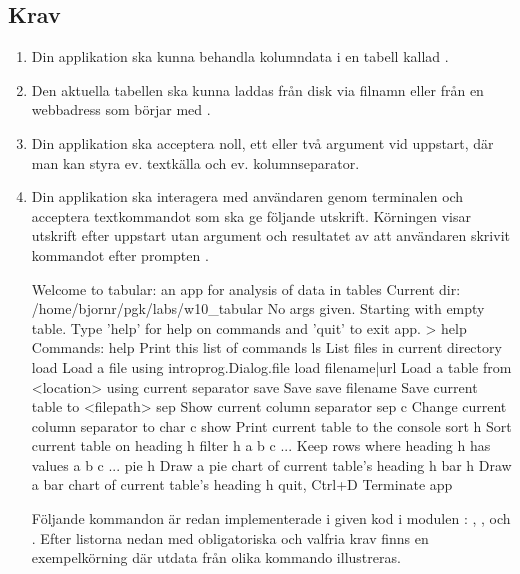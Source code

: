 \subsection{Krav}\label{tabular:requirements}

\begin{enumerate}[leftmargin=*]
\item Din applikation ska kunna behandla kolumndata i en tabell kallad .

\item Den aktuella tabellen ska kunna laddas från disk via filnamn eller från en webbadress som börjar med .

\item Din applikation ska acceptera noll, ett eller två argument vid uppstart, där man kan styra ev. textkälla och ev. kolumnseparator.

\item Din applikation ska interagera med användaren genom terminalen och acceptera textkommandot  som ska ge följande utskrift. Körningen visar utskrift efter uppstart utan argument och resultatet av att användaren skrivit kommandot  efter prompten .

\begin{REPLnonum}
Welcome to tabular: an app for analysis of data in tables
Current dir: /home/bjornr/pgk/labs/w10_tabular
No args given. Starting with empty table.
Type 'help' for help on commands and 'quit' to exit app.
> help
Commands:
help                 Print this list of commands
ls                   List files in current directory
load                 Load a file using introprog.Dialog.file
load filename|url    Load a table from <location> using current separator
save                 Save
save filename        Save current table to <filepath>
sep                  Show current column separator
sep c                Change current column separator to char c
show                 Print current table to the console
sort h               Sort current table on heading h
filter h a b c ...   Keep rows where heading h has values a b c ...
pie h                Draw a pie chart of current table's heading h
bar h                Draw a bar chart of current table's heading h
quit, Ctrl+D         Terminate app
\end{REPLnonum}
Följande kommandon är redan implementerade i given kod i modulen : , ,  och . Efter listorna nedan med obligatoriska och valfria krav finns en exempelkörning där utdata från olika kommando illustreras.


\end{enumerate}
